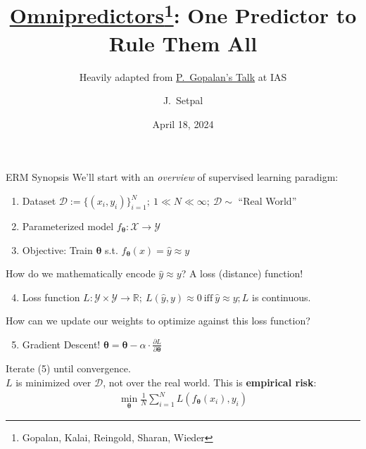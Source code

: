\documentclass{beamer}
\title[Omnipredictors]{\href{https://arxiv.org/abs/2109.05389}{Omnipredictors}\thanks{Gopalan, Kalai, Reingold, Sharan, Wieder}: One Predictor to Rule Them All}
\subtitle{Heavily adapted from \href{https://youtu.be/DCPRdL03-dk}{P.~Gopalan's Talk} at IAS}
\author[Machine Learning @ Purdue] %
{J.~Setpal}
\date{April 18, 2024}
\begin{document}
\frame{\titlepage}



\begin{frame}{ERM Synopsis}
	We'll start with an \textit{overview} of supervised learning paradigm:
	\begin{enumerate}[label=\arabic*.]
		\item Dataset $\mathcal{D} := \{(x_i, y_i)\}^N_{i=1};~1 \ll N \ll \infty;~\mathcal{D} \sim $ ``Real World'' \pause
		\item Parameterized model $f_{\bm{\theta}} : \mathcal{X} \rightarrow \mathcal{Y}$ \pause
		\item Objective: Train $\bm{\theta}$ s.t. $f_{\bm{\theta}}(x) = \hat{y} \approx y$ \pause
	\end{enumerate}
	How do we mathematically encode $\hat{y} \approx y$? \pause A loss (distance) function!
	\begin{enumerate}[label=\arabic*.]
			\setcounter{enumi}{3}
		\item Loss function $L : \mathcal{Y} \times \mathcal{Y} \rightarrow \mathbb{R};~L(\hat{y}, y) \approx 0~\text{iff}~\hat{y} \approx y; L$ is continuous. \pause
	\end{enumerate}
	How can we update our weights to optimize against this loss function? \pause
	\begin{enumerate}[label=\arabic*.]
			\setcounter{enumi}{4}
		\item Gradient Descent! $\bm{\theta} = \bm{\theta} - \alpha \cdot \frac{\partial L}{\partial \bm{\theta}}$
	\end{enumerate}
	Iterate (5) until convergence. \pause \newline \\
	$L$ is minimized over $\mathcal{D}$, not over the real world. \pause This is \textbf{empirical risk}:
	\begin{gather}
		\min_{\bm{\theta}} \frac{1}{N}\sum^N_{i=1} L(f_{\bm{\theta}}(x_i), y_i)
	\end{gather}
\end{frame}
\end{document}
